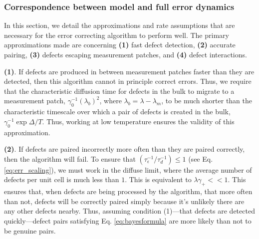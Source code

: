 \documentclass[twocolumn,superscriptaddress,aps,prb,floatfix]{revtex4-1}
\begin{document}
 \subsubsection{Correspondence between model and full error dynamics}
 \label{sec:correspondence}
 
 In this section, we detail the approximations and rate assumptions that are necessary for the error correcting algorithm to perform well.  The primary approximations made are concerning \textbf{(1)} fast defect detection, \textbf{(2)} accurate pairing, \textbf{(3)} defects escaping measurement patches, and \textbf{(4)} defect interactions.
 
 \textbf{(1)}. If defects are produced in between measurement patches faster than they are detected, then this algorithm cannot in principle correct errors.  Thus, we require that the characteristic diffusion time for defects in the bulk to migrate to a measurement patch, $\gamma_0^{-1}(\lambda_b)^2$, where $\lambda_b=\lambda-\lambda_m$, to be much shorter than the characteristic timescale over which a pair of defects is created in the bulk, $\gamma_0^{-1} \exp{\Delta/T}$.  Thus, working at low temperature ensures the validity of this approximation.
 
 \textbf{(2)}. If defects are paired incorrectly more often than they are paired correctly, then the algorithm will fail.  To ensure that $(\tau_{\epsilon}^{-1} / \tau_d^{-1})\leq1$ (see Eq. \ref{eq:err_scaling}), we must work in the diffuse limit, where the average number of defects per unit cell is much less than $1$.  This is equivalent to $\lambda \gamma_+<<1$.  This ensures that, when defects are being processed by the algorithm, that more often than not, defects will be correctly paired simply because it's unlikely there are any other defects nearby.  Thus, assuming condition (1)---that defects are detected quickly---defect pairs satisfying Eq. \ref{eq:bayesformula} are more likely than not to be genuine pairs. 
 
\end{document}
